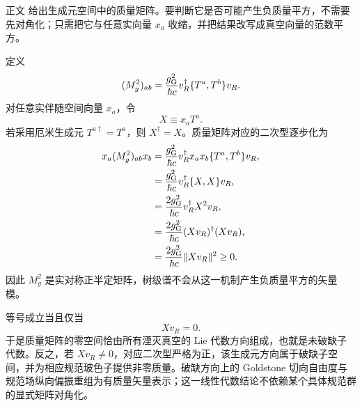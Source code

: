 \begin{derivation}

正文 给出生成元空间中的质量矩阵。要判断它是否可能产生负质量平方，不需要先对角化；只需把它与任意实向量 \(x_a\) 收缩，并把结果改写成真空向量的范数平方。


定义
\begin{equation*}
 (M_g^2)_{ab}
 =\frac{g_{\rm G}^2}{\hbar c}
 v_R^\dagger\{T^a,T^b\}v_R.
\end{equation*}
对任意实伴随空间向量 $x_a$，令
\begin{equation*}
 X\equiv x_aT^a.
\end{equation*}
若采用厄米生成元 $T^{a\dagger}=T^a$，则 $X^\dagger=X$。质量矩阵对应的二次型逐步化为
\begin{align*}
 x_a(M_g^2)_{ab}x_b
 &=\frac{g_{\rm G}^2}{\hbar c}
 v_R^\dagger x_ax_b\{T^a,T^b\}v_R,\\
 &=\frac{g_{\rm G}^2}{\hbar c}
 v_R^\dagger\{X,X\}v_R,\\
 &=\frac{2g_{\rm G}^2}{\hbar c}v_R^\dagger X^2v_R,\\
 &=\frac{2g_{\rm G}^2}{\hbar c}(Xv_R)^\dagger(Xv_R),\\
 &=\frac{2g_{\rm G}^2}{\hbar c}\|Xv_R\|^2\ge0.
\end{align*}
因此 $M_g^2$ 是实对称正半定矩阵，树级谱不会从这一机制产生负质量平方的矢量模。

等号成立当且仅当
\begin{equation*}
 Xv_R=0.
\end{equation*}
于是质量矩阵的零空间恰由所有湮灭真空的 Lie 代数方向组成，也就是未破缺子代数。反之，若 $Xv_R\neq0$，对应二次型严格为正，该生成元方向属于破缺子空间，并为相应规范玻色子提供非零质量。破缺方向上的 Goldstone 切向自由度与规范场纵向偏振重组为有质量矢量表示；这一线性代数结论不依赖某个具体规范群的显式矩阵对角化。
\end{derivation}
